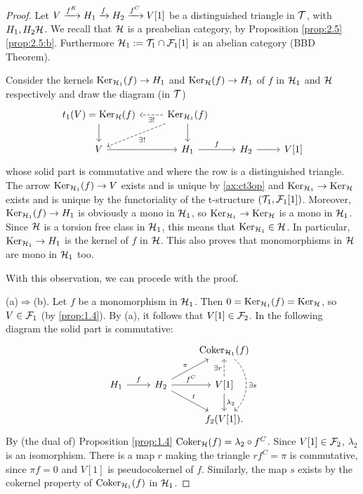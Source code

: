 \begin{proof}
  Let $V\xrightarrow{f^K}H_1\xrightarrow{f}H_2\xrightarrow{f^C}V[1]$ be a distinguished triangle in $\mathcal{T}$, with $H_1,H_2\mathcal{H}$. We recall that $\mathcal{H}$ is a preabelian category, by Proposition \ref{prop:2.5}\ref{prop:2.5:b}. Furthermore $\mathcal{H}_1:=\mathcal{T}_1\cap\mathcal{F}_1[1]$ is an abelian category (BBD Theorem).

  Consider the kernels $\operatorname{Ker}_{\mathcal{H}_1}(f)\to H_1$ and $\operatorname{Ker}_{\mathcal{H}}(f)\to H_1$ of $f$ in $\mathcal{H}_1$ and $\mathcal{H}$ respectively and draw the diagram (in $\mathcal{T}$)
  \begin{equation*}
    \begin{tikzcd}
      t_1(V)=\Ker_\clH(f)\arrow{d}
      & \Ker_{\clH_1}(f)\arrow{d}\arrow[dashed]{dl}{\exists !}\arrow[dashed]{l}{\exists !}
        & &\\
      V\arrow{r}
      & H_1\arrow{r}{f}
      & H_2\arrow{r}
      & V[1]
    \end{tikzcd}
  \end{equation*}
  whose solid part is commutative and where the row is a distinguished triangle. The arrow $\operatorname{Ker}_{\mathcal{H}_1}(f)\to V$ exists and is unique by \ref{ax:ct3op} and $\operatorname{Ker}_{\mathcal{H}_1}\to \operatorname{Ker}_{\mathcal{H}}$ exists and is unique by the functoriality of the t-structure $(\mathcal{T}_1,\mathcal{F}_1[1])$. Moreover, $\operatorname{Ker}_{\mathcal{H}_1}(f) \to H_1$ is obviously a mono in $\mathcal{H}_1$, so $\operatorname{Ker}_{\mathcal{H}_1}\to \operatorname{Ker}_{\mathcal{H}}$ is a mono in $\mathcal{H}_1$. Since $\mathcal{H}$ is a torsion free class in $\mathcal{H}_1$, this means that $\operatorname{Ker}_{\mathcal{H}_1}\in\mathcal{H}$. In particular, $\operatorname{Ker}_{\mathcal{H}_1}\to H_1$ is the kernel of $f$ in $\mathcal{H}$. This also proves that monomorphisms in $\mathcal{H}$ are mono in $\mathcal{H}_1$ too.

  With this observation, we can procede with the proof.

  \smallskip\noindent
  (a)$\Rightarrow$(b). Let $f$ be a monomorphism in $\mathcal{H}_1$. Then $0=\operatorname{Ker}_{\mathcal{H}_1}(f)=\operatorname{Ker}_{\mathcal{H}}$, so $V\in\mathcal{F}_1$ (by \ref{prop:1.4}). By (a), it follows that $V[1]\in\mathcal{F}_2$. In the following diagram the solid part is commutative:
  \begin{equation*}
    \begin{tikzcd}
      & & \Coker_{\clH_1}(f)\arrow[bend left=50,dashed]{dd}{\exists s}\\
      H_1\arrow{r}{f}
      & H_2\arrow{ur}{\pi}\arrow{r}{f^C}\arrow{dr}{t}
        & V[1]\arrow[dashed]{u}{\exists r}\arrow{d}{\lambda_2}\\
      & & f_2(V[1]).
    \end{tikzcd}
  \end{equation*}
  By (the dual of) Proposition \ref{prop:1.4} $\operatorname{Coker}_{\mathcal{H}}(f)=\lambda_2\circ f^C$. Since $V[1]\in\mathcal{F}_2$, $\lambda_2$ is an isomorphism. There is a map $r$ making the triangle $rf^C=\pi$ is commutative, since $\pi f =0$ and $V[1]$ is pseudocokernel of $f$. Similarly, the map $s$ exists by the cokernel property of $\operatorname{Coker}_{\mathcal{H}_1}(f)$ in $\mathcal{H}_1$.


\end{proof}
